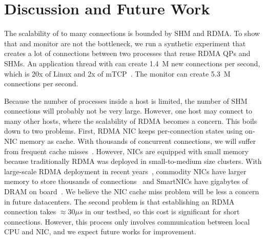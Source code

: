 \section{Discussion and Future Work}
\label{sec:discussion}



The scalability of \sys{} to many connections is bounded by SHM and RDMA.
To show that \libipc{} and monitor are not the bottleneck, we run a synthetic experiment that creates a lot of connections between two processes that reuse RDMA QPs and SHMs. An application thread with \libipc{} can create 1.4~M new connections per second, which is 20x of Linux and 2x of mTCP~\cite{jeong2014mtcp}. The monitor can create 5.3~M connections per second.

Because the number of processes inside a host is limited, the number of SHM connections will probably not be very large.
However, one host may connect to many other hosts, where the scalability of RDMA becomes a concern.
This boils down to two problems.
First, RDMA NIC keeps per-connection states using on-NIC memory as cache. With thousands of concurrent connections, we will suffer from frequent cache misses~\cite{mprdma,kaminsky2016design,kalia2018datacenter}.
However, NICs are equipped with small memory because traditionally RDMA was deployed in small-to-medium size clusters.
With large-scale RDMA deployment in recent years~\cite{guo2016rdma}, commodity NICs have larger memory to store thousands of connections~\cite{kalia2018datacenter} and SmartNICs have gigabytes of DRAM on board~\cite{mellanox-innova,mellanox-bluefield,smartnic}.
We believe the NIC cache miss problem will be less a concern in future datacenters.
The second problem is that establishing an RDMA connection takes $\approx30 \mu s$ in our testbed, so this cost is significant for short connections. However, this process only involves communication between local CPU and NIC, and we expect future works for improvement.

